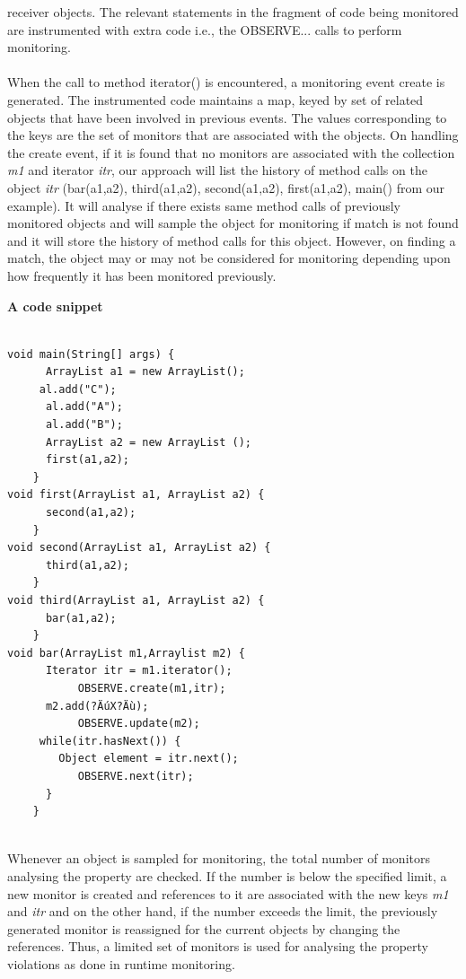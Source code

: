 {receiver objects. The relevant statements in the fragment of code being 
monitored are instrumented with extra code i.e., the OBSERVE... calls to perform 
monitoring.\\\\
When the call to method iterator() is encountered, a monitoring event create is 
generated. The instrumented code maintains a map, keyed by set of related 
objects that have been involved in previous events. The values corresponding to 
the keys are the set of monitors that are associated with the objects. On 
handling the create event, if it is found that no monitors are associated with 
the collection \textit{m1} and iterator \textit{itr}, our approach will list the 
history of method calls on the object \textit{itr} (bar(a1,a2), third(a1,a2), 
second(a1,a2), first(a1,a2), main() from our example). It will analyse if there 
exists same method calls of previously monitored objects and will sample the 
object for monitoring if match is not found and it will store the history of 
method calls for this object. However, on finding a match, the object may or may 
not be considered for monitoring depending upon how frequently it has been 
monitored previously.
\begin{center}
\textbf{A code snippet}
\begin{lstlisting}

void main(String[] args) {
	  ArrayList a1 = new ArrayList();
     al.add("C");
	  al.add("A");
	  al.add("B"); 
	  ArrayList a2 = new ArrayList ();
	  first(a1,a2);
	}
void first(ArrayList a1, ArrayList a2) { 
	  second(a1,a2); 
	} 
void second(ArrayList a1, ArrayList a2) {
	  third(a1,a2); 
	} 
void third(ArrayList a1, ArrayList a2) {
	  bar(a1,a2); 
	}
void bar(ArrayList m1,Arraylist m2) {
	  Iterator itr = m1.iterator();
		   OBSERVE.create(m1,itr);
	  m2.add(?ÄúX?Äù);
		   OBSERVE.update(m2);
     while(itr.hasNext()) {
	    Object element = itr.next();
		   OBSERVE.next(itr);
	  }
	}
    
\end{lstlisting}
\end{center}


Whenever an object is sampled for monitoring, the total number of monitors 
analysing the property are checked. If the number is below the specified limit, 
a new monitor is created and references to it are associated with the new keys 
\textit{m1} and \textit{itr} and on the other hand, if the number exceeds the 
limit, the previously generated monitor is reassigned for the current objects by 
changing the references. Thus, a limited set of monitors is used for analysing 
the property violations as done in runtime monitoring. 
}














